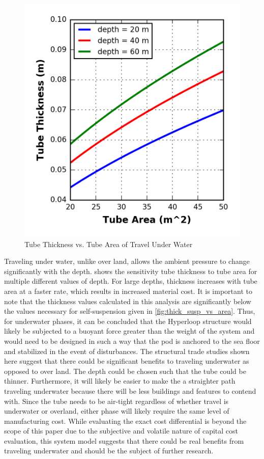 \begin{figure}
	\centering
	\includegraphics{../../images/graphs/underwater_structural_trades/tube_area_vs_depth.png}
	\caption{Tube Thickness vs. Tube Area of Travel Under Water}
	\label{fig:tube_thick_vs_tube_area_underwater}
\end{figure}

Traveling under water, unlike over land, allows the ambient pressure to change
significantly with the depth. 
shows the sensitivity tube thickness to tube area for multiple different values of depth.
For large depths, thickness increases with tube area at a faster rate, which
results in increased material cost. It is important to note that the thickness
values calculated in this analysis are significantly below the values necessary
for self-suspension given in \cref{fig:thick_susp_vs_area}. Thus, for
underwater phases, it can be concluded that the Hyperloop structure would
likely be subjected to a buoyant force greater than the weight of the system
and would need to be designed in such a way that the pod is anchored to the sea
floor and stabilized in the event of disturbances.
The structural trade studies shown here suggest that there could be significant
benefits to traveling underwater as opposed to over land. The depth could be
chosen such that the tube could be thinner. Furthermore, it will likely be
easier to make the a straighter path traveling underwater because there will be
less buildings and features to contend with. Since the tube needs to be
air-tight regardless of whether travel is underwater or overland, either phase
will likely require the same level of manufacturing cost. While evaluating the
exact cost differential is beyond the scope of this paper due to the subjective
and volatile nature of capital cost evaluation, this system model suggests that
there could be real benefits from traveling underwater and should be the subject of further research.
